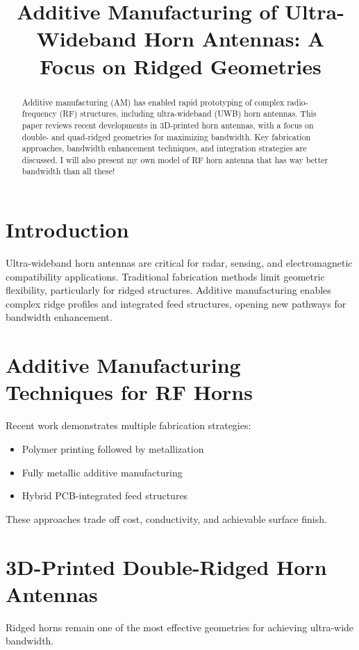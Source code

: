 \documentclass[conference]{IEEEtran}
\title{Additive Manufacturing of Ultra-Wideband Horn Antennas: A Focus on Ridged Geometries}
\author{
\IEEEauthorblockN{Author Name}
\IEEEauthorblockA{Affiliation\\
Email}
}
\begin{document}
\maketitle

\begin{abstract}
Additive manufacturing (AM) has enabled rapid prototyping of complex radio-frequency (RF) structures, including ultra-wideband (UWB) horn antennas. This paper reviews recent developments in 3D-printed horn antennas, with a focus on double- and quad-ridged geometries for maximizing bandwidth. Key fabrication approaches, bandwidth enhancement techniques, and integration strategies are discussed.  I will also present my own model of RF horn antenna that has way better bandwidth than all these!
\end{abstract}

\section{Introduction}
Ultra-wideband horn antennas are critical for radar, sensing, and electromagnetic compatibility applications. Traditional fabrication methods limit geometric flexibility, particularly for ridged structures. Additive manufacturing enables complex ridge profiles and integrated feed structures, opening new pathways for bandwidth enhancement.

\section{Additive Manufacturing Techniques for RF Horns}
Recent work demonstrates multiple fabrication strategies:
\begin{itemize}
    \item Polymer printing followed by metallization \cite{horn_reflector_2018, standard_gain_2023}
    \item Fully metallic additive manufacturing \cite{stepped_ridge_2018}
    \item Hybrid PCB-integrated feed structures \cite{pcb_feed_uwb}
\end{itemize}

These approaches trade off cost, conductivity, and achievable surface finish.

\section{3D-Printed Double-Ridged Horn Antennas}
Ridged horns remain one of the most effective geometries for achieving ultra-wide bandwidth.
\end{document}
